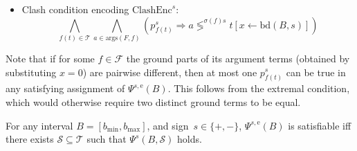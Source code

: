 \documentclass[runningheads]{llncs}
\newcommand{\cmpsignstrict}[1]{\lessgtr^{#1}}
\newcommand{\coeffsign}[1]{\sigma(#1)}
\newcommand{\ivbound}[2]{\text{bd}(#1,#2)}
\newcommand{\args}{\text{args}}
\newcommand{\subst}[3]{#1[#2\leftarrow #3]}
\begin{document}
\begin{definition}
\begin{itemize}
    \item Clash condition encoding $\text{ClashEnc}^s$:
\[  \bigwedge_{f(t)\in\mathcal {T}}\bigwedge_{a \in \args(F,f)} \left(p^s_{f(t)} \Rightarrow a\cmpsignstrict{\coeffsign{f}s}  \subst{t}{x}{\ivbound{B}{s}}\right)    \]
\end{itemize}
\end{definition}

Note that if for some $f\in\mathcal{{F}}$ the ground parts of its argument terms (obtained by substituting $x=0$) are pairwise different, then at most one $p^s_{f(t)}$ can be true in any satisfying assignment of $\Psi^{s,\text{e}}(B)$. This follows from the extremal condition, which would otherwise require two distinct ground terms to be equal.

\begin{property}
\label{lem:encoding-correctness}
For any interval $B = [b_{\min}, b_{\max}]$,  and sign~$s\in\{+, -\}$, 
 $\Psi^{s,\text{e}}(B)$ is satisfiable iff there exists $\mathcal{S}\subseteq\mathcal{T}$ such that $\Psi^{s}(B,\mathcal{S})$ holds.
\end{property}


\end{document}
